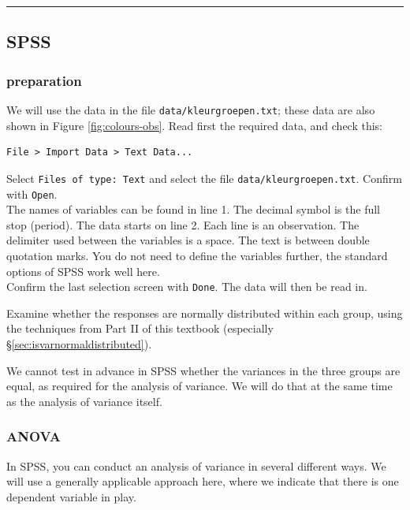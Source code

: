 \documentclass[
]{book}
\begin{document}
\begin{center}\rule{0.5\linewidth}{0.5pt}\end{center}

\hypertarget{spss-12}{%
\subsection{SPSS}\label{spss-12}}

\hypertarget{preparation}{%
\subsubsection{preparation}\label{preparation}}

We will use the data in the file \texttt{data/kleurgroepen.txt}; these data are also shown in Figure \ref{fig:colours-obs}.
Read first the required data, and check this:

\begin{verbatim}
File > Import Data > Text Data...
\end{verbatim}

Select \texttt{Files\ of\ type:\ Text} and select the file
\texttt{data/kleurgroepen.txt}. Confirm with \texttt{Open}.\\
The names of variables can be found in line 1. The decimal symbol is
the full stop (period). The data starts on line 2. Each line is an observation.
The delimiter used between the variables is a space. The text is between
double quotation marks. You do not need to define the variables further,
the standard options of SPSS work well here.\\
Confirm the last selection screen with \texttt{Done}. The data will
then be read in.

Examine whether the responses are normally distributed within each group, using the
techniques from Part II of this textbook (especially
§\ref{sec:isvarnormaldistributed}).

We cannot test in advance in SPSS whether the variances in the three groups
are equal, as required for the analysis of variance. We will do that at the same
time as the analysis of variance itself.

\hypertarget{anova}{%
\subsubsection{ANOVA}\label{anova}}

In SPSS, you can conduct an analysis of variance in several
different ways. We
will use a generally applicable approach here, where we indicate that there
is one dependent variable in play.\\
\end{document}
